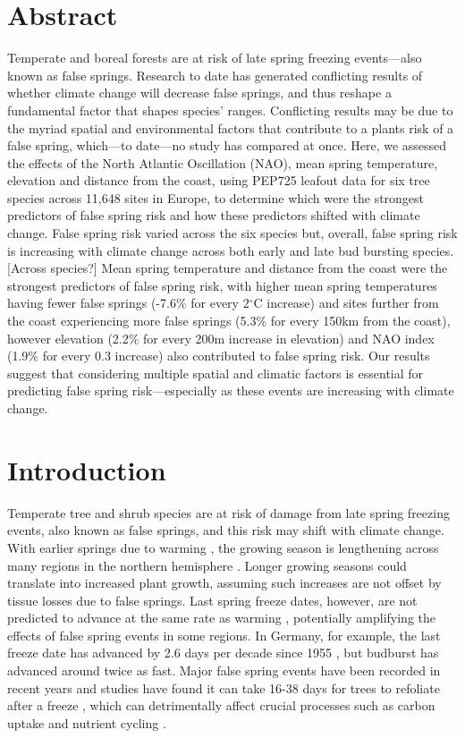 \documentclass{article}\usepackage[]{graphicx}\usepackage[]{color}
\begin{document}
\section*{Abstract}
Temperate and boreal forests are at risk of late spring freezing events---also known as false springs. Research to date has generated conflicting results of whether climate change will decrease false springs, and thus reshape a fundamental factor that shapes species' ranges. Conflicting results may be due to the myriad spatial and environmental factors that contribute to a plants risk of a false spring, which---to date---no study has compared at once. Here, we assessed the effects of the North Atlantic Oscillation (NAO), mean spring temperature, elevation and distance from the coast, using PEP725 leafout data for six tree species across 11,648 sites in Europe, to determine which were the strongest predictors of false spring risk and how these predictors shifted with climate change. False spring risk varied across the six species but, overall, false spring risk is increasing with climate change across both early and late bud bursting species. [Across species?] Mean spring temperature and distance from the coast were the strongest predictors of false spring risk, with higher mean spring temperatures having fewer false springs (-7.6\% for every 2$^{\circ}$C increase) and sites further from the coast experiencing more false springs (5.3\% for every 150km from the coast), however elevation (2.2\% for every 200m increase in elevation) and NAO index (1.9\% for every 0.3 increase) also contributed to false spring risk. Our results suggest that considering multiple spatial and climatic factors is essential for predicting false spring risk---especially as these events are increasing with climate change.

\section*{Introduction}
Temperate tree and shrub species are at risk of damage from late spring freezing events, also known as false springs, and this risk may shift with climate change. With earlier springs due to warming \citep{IPCC2014, Wolkovich2012}, the growing season is lengthening across many regions in the northern hemisphere \citep{Chen2005, Kukal2018, Liu2006}. Longer growing seasons could translate into increased plant growth, assuming such increases are not offset by tissue losses due to false springs. Last spring freeze dates, however, are not predicted to advance at the same rate as warming \citep{Inouye2008, Labe2016, Martin2010,Wypych2016a,Sgubin2018}, potentially amplifying the effects of false spring events in some regions. In Germany, for example, the last freeze date has advanced by 2.6 days per decade since 1955 \citep{Zohner2016}, but budburst has advanced around twice as fast. Major false spring events have been recorded in recent years and studies have found it can take 16-38 days for trees to refoliate after a freeze \citep{Augspurger2009, Augspurger2013, Gu2008, Menzel2015}, which can detrimentally affect crucial processes such as carbon uptake and nutrient cycling \citep{Hufkens2012, Klosterman2018, Richardson2013}. 
\end{document}
